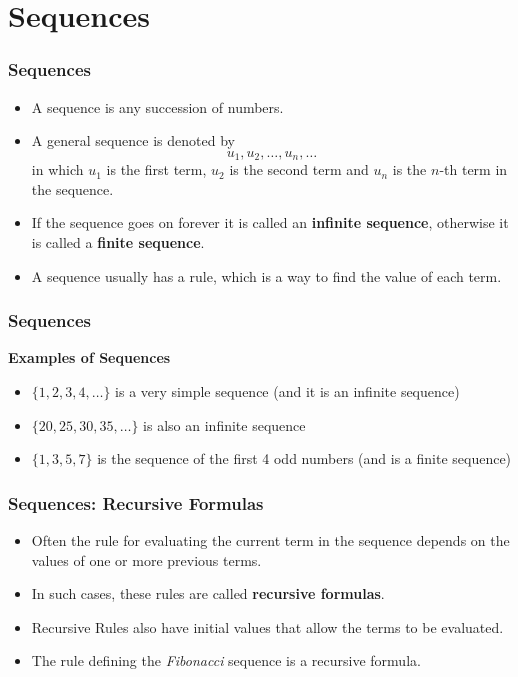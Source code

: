 \documentclass{beamer}
\begin{document}
\section{Sequences}

\begin{frame}
\frametitle{Sequences}
\large
\begin{itemize}
\item A sequence is any succession of numbers. 
\item A general sequence is denoted by
\[ u_1, u_2, \ldots , u_n, \ldots \]
in which $u_1$ is the first term, $u_2$ is the second term and $u_n$ is the $n$-th 
term in the sequence.
\item If the sequence goes on forever it is called an \textbf{infinite sequence},
otherwise it is called a \textbf{finite sequence}.
\item A sequence usually has a rule, which is a way to find the value of each term.
\end{itemize}
\end{frame}
\begin{frame}
\frametitle{Sequences}
\large
\vspace{-1.5cm}
\textbf{Examples of Sequences}
\begin{itemize}
\item $\{1, 2, 3, 4 ,\ldots\}$ is a very simple sequence (and it is an infinite sequence)
\item $\{20, 25, 30, 35, \ldots \}$ is also an infinite sequence
\item $\{1, 3, 5, 7\}$ is the sequence of the first 4 odd numbers (and is a finite sequence)
\end{itemize}
\end{frame}
\begin{frame}
\frametitle{Sequences: Recursive Formulas}
\begin{itemize}
\item Often the rule for evaluating the current term in the sequence depends on the values of one or more previous terms.
\item In such cases, these rules are called \textbf{recursive formulas}.
\item Recursive Rules also have initial values that allow the terms to be evaluated.
\item The rule defining the \textit{Fibonacci} sequence is a recursive formula.
\end{itemize}
\end{frame}
\end{document}
